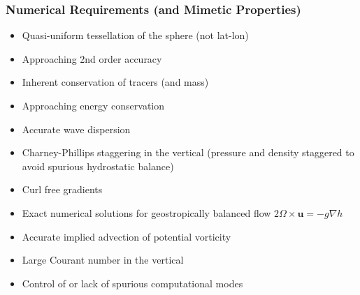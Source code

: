\begin{frame}
\frametitle{Numerical Requirements (and Mimetic Properties)}
\pause
\begin{itemize}
\item Quasi-uniform tessellation of the sphere (not lat-lon) \pause
\item Approaching 2nd order accuracy \pause
\item Inherent conservation of tracers (and mass) \pause
\item Approaching energy conservation \pause
\item Accurate wave dispersion
    \pause\pause
    \item Charney-Phillips staggering in the vertical (pressure and density staggered to avoid spurious hydrostatic balance)\pause
    \item Curl free gradients\pause
    
    \item Exact numerical solutions for geostropically balanced flow $2\Omega\times\mathbf{u}=-g\nabla h$\pause
    \item Accurate implied advection of potential vorticity\pause
    \item Large Courant number in the vertical\pause
    \item<only@14> Control of or lack of spurious computational modes
\end{itemize}


\end{frame}

